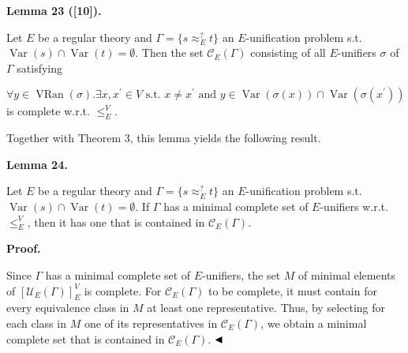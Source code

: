  
 
\par\medskip\noindent\textbf{Lemma 23 ([10]).}\par
 
 
Let $E$ be a regular theory and $\Gamma=\{s\approx_{E}^{?}t\}$ an $E$-unification problem s.t. $\operatorname{Var}(s)\cap\operatorname{Var}(t)=\emptyset$. Then the set $\mathcal{C}_{E}(\Gamma)$ consisting of all $E$-unifiers $\sigma$ of $\Gamma$ satisfying\par
    \[\forall y\in\operatorname{VRan}(\sigma).\exists x,x^{\prime}\in V\text{ s.t. }%
x\neq x^{\prime}\text{ and }y\in\operatorname{Var}(\sigma(x))\cap\operatorname%
{Var}(\sigma(x^{\prime}))\]    
is complete w.r.t. $\leq_{E}^{V}$.\par
 
 
 
 
Together with Theorem 3, this lemma yields the following result.\par
 
 
 
\par\medskip\noindent\textbf{Lemma 24.}\par
 
 
Let $E$ be a regular theory and $\Gamma=\{s\approx_{E}^{?}t\}$ an $E$-unification problem s.t. $\operatorname{Var}(s)\cap\operatorname{Var}(t)=\emptyset$. If $\Gamma$ has a minimal complete set of $E$-unifiers w.r.t. $\leq_{E}^{V}$, then it has one that is contained in $\mathcal{C}_{E}(\Gamma)$.\par
 
 
 
 
\par\medskip\noindent\textbf{Proof.}\par
 
 
Since $\Gamma$ has a minimal complete set of $E$-unifiers, the set $M$ of minimal elements of $[\mathcal{U}_{E}(\Gamma)]_{E}^{V}$ is complete. For $\mathcal{C}_{E}(\Gamma)$ to be complete, it must contain for every equivalence class in $M$ at least one representative. Thus, by selecting for each class in $M$ one of its representatives in $\mathcal{C}_{E}(\Gamma)$, we obtain a minimal complete set that is contained in $\mathcal{C}_{E}(\Gamma)$. $\hfill\blacktriangleleft$\par
 
